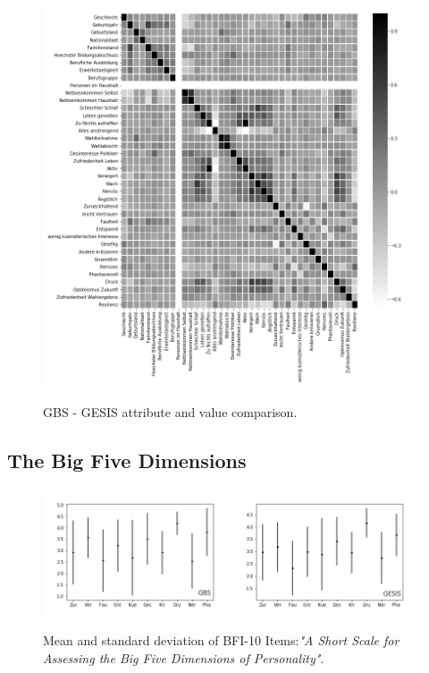 \begin{figure}[ht]
	\begin{center}
		\includegraphics[scale=0.52,angle=0]{fig/gbs_corr}
		\label{std}
		\caption{GBS - GESIS attribute and value comparison.}
	\end{center}
\end{figure}

\subsection{The Big Five Dimensions}

\begin{figure}[ht]
	\begin{center}
		\includegraphics[scale=0.55,angle=0]{fig/std_figure}
		\label{std}
		\caption{Mean and standard deviation of BFI-10 Items:\textit{"A Short Scale for Assessing the Big Five Dimensions of Personality"}.}
	\end{center}
\end{figure}

